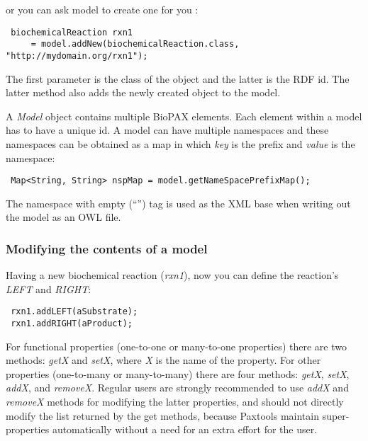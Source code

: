 \documentclass[10pt]{article}
\newenvironment{mylisting}
{\begin{list}{}{\setlength{\leftmargin}{2em}}\item\small\bfseries}
{\end{list}}
\begin{document}
or you can ask model to create one for you :

\begin{mylisting}
\begin{verbatim}
 biochemicalReaction rxn1 
     = model.addNew(biochemicalReaction.class, "http://mydomain.org/rxn1");
\end{verbatim}
\end{mylisting}

The first parameter is the class of the object and the latter is the RDF id. The latter method also adds the newly created object to the model.

A \textit{Model} object contains multiple BioPAX elements. Each element within a model has to have a unique id. A model can have multiple namespaces and these namespaces can be obtained as a map in which \textit{key} is the prefix and \textit{value} is the namespace:

\begin{mylisting}
\begin{verbatim}
 Map<String, String> nspMap = model.getNameSpacePrefixMap();
\end{verbatim}
\end{mylisting}

The namespace with empty (``'') tag is used as the XML base when writing out the model as an OWL file.

\subsubsection{Modifying the contents of a model}
Having a new biochemical reaction (\textit{rxn1}), now you can define the reaction's \textit{LEFT} and \textit{RIGHT}:

\begin{mylisting}
\begin{verbatim}
 rxn1.addLEFT(aSubstrate);
 rxn1.addRIGHT(aProduct);
\end{verbatim}
\end{mylisting}

For functional properties (one-to-one or many-to-one properties) there are two methods: \textit{getX} and \textit{setX}, where \textit{X} is the name of the property. For other properties (one-to-many or many-to-many) there are four methods: \textit{getX}, \textit{setX}, \textit{addX}, and \textit{removeX}. Regular users are strongly recommended to use \textit{addX} and \textit{removeX} methods for modifying the latter properties, and should not directly modify the list returned by the get methods, because Paxtools maintain super-properties automatically without a need for an extra effort for the user.
\end{document}
